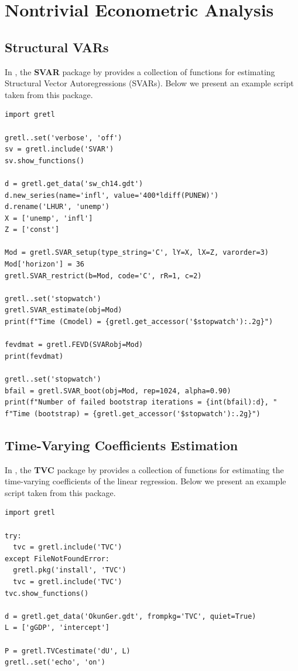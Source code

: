 \section{Nontrivial Econometric Analysis}
\subsection{Structural VARs}
In \gretl, the \textbf{SVAR} package by \cite{JackSven_SVAR_wp}
provides a collection of functions for estimating Structural
Vector Autoregressions (SVARs). Below we present an example
script taken from this package.
\begin{lstlisting}[style=pythonstylefoot]
import gretl

gretl..set('verbose', 'off')
sv = gretl.include('SVAR')
sv.show_functions()

d = gretl.get_data('sw_ch14.gdt')
d.new_series(name='infl', value='400*ldiff(PUNEW)')
d.rename('LHUR', 'unemp')
X = ['unemp', 'infl']
Z = ['const']

Mod = gretl.SVAR_setup(type_string='C', lY=X, lX=Z, varorder=3)
Mod['horizon'] = 36
gretl.SVAR_restrict(b=Mod, code='C', rR=1, c=2)

gretl..set('stopwatch')
gretl.SVAR_estimate(obj=Mod)
print(f"Time (Cmodel) = {gretl.get_accessor('$stopwatch'):.2g}")

fevdmat = gretl.FEVD(SVARobj=Mod)
print(fevdmat)

gretl..set('stopwatch')
bfail = gretl.SVAR_boot(obj=Mod, rep=1024, alpha=0.90)
print(f"Number of failed bootstrap iterations = {int(bfail):d}, "
f"Time (bootstrap) = {gretl.get_accessor('$stopwatch'):.2g}")
\end{lstlisting}%


\subsection{Time-Varying Coefficients Estimation}
In \gretl, the \textbf{TVC} package by \cite{Schlicht_TVC_pkg}
provides a collection of functions for estimating the
time-varying coefficients of the linear regression.
Below we present an example script taken from this package.
\begin{lstlisting}[style=pythonstylefoot]
import gretl

try:
  tvc = gretl.include('TVC')
except FileNotFoundError:
  gretl.pkg('install', 'TVC')
  tvc = gretl.include('TVC')
tvc.show_functions()

d = gretl.get_data('OkunGer.gdt', frompkg='TVC', quiet=True)
L = ['gGDP', 'intercept']

P = gretl.TVCestimate('dU', L)
gretl..set('echo', 'on')
\end{lstlisting}%
